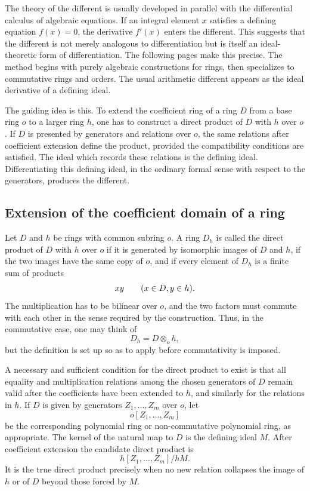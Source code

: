 \documentclass[11pt]{article}
\begin{document}
The theory of the different is usually developed in parallel with the differential calculus of algebraic equations. If an integral element \(x\) satisfies a defining equation \(f(x)=0\), the derivative \(f'(x)\) enters the different. This suggests that the different is not merely analogous to differentiation but is itself an ideal-theoretic form of differentiation. The following pages make this precise. The method begins with purely algebraic constructions for rings, then specializes to commutative rings and orders. The usual arithmetic different appears as the ideal derivative of a defining ideal.

The guiding idea is this. To extend the coefficient ring of a ring \(D\) from a base ring \(o\) to a larger ring \(h\), one has to construct a direct product of \(D\) with \(h\) over \(o\). If \(D\) is presented by generators and relations over \(o\), the same relations after coefficient extension define the product, provided the compatibility conditions are satisfied. The ideal which records these relations is the defining ideal. Differentiating this defining ideal, in the ordinary formal sense with respect to the generators, produces the different.

\subsection{Extension of the coefficient domain of a ring}

Let \(D\) and \(h\) be rings with common subring \(o\). A ring \(D_h\) is called the direct product of \(D\) with \(h\) over \(o\) if it is generated by isomorphic images of \(D\) and \(h\), if the two images have the same copy of \(o\), and if every element of \(D_h\) is a finite sum of products
\[
  x y\qquad(x\in D,\\ y\in h).
\]
The multiplication has to be bilinear over \(o\), and the two factors must commute with each other in the sense required by the construction. Thus, in the commutative case, one may think of
\[
  D_h=D\otimes_o h,
\]
but the definition is set up so as to apply before commutativity is imposed.

A necessary and sufficient condition for the direct product to exist is that all equality and multiplication relations among the chosen generators of \(D\) remain valid after the coefficients have been extended to \(h\), and similarly for the relations in \(h\). If \(D\) is given by generators \(Z_1,\ldots,Z_m\) over \(o\), let
\[
  o[Z_1,\ldots,Z_m]
\]
be the corresponding polynomial ring or non-commutative polynomial ring, as appropriate. The kernel of the natural map to \(D\) is the defining ideal \(M\). After coefficient extension the candidate direct product is
\[
  h[Z_1,
  \ldots,Z_m]/hM.
\]
It is the true direct product precisely when no new relation collapses the image of \(h\) or of \(D\) beyond those forced by \(M\).
\end{document}
